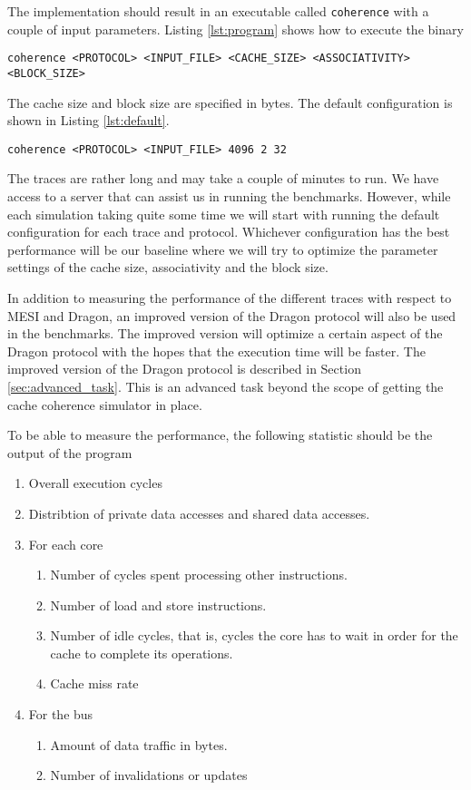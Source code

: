 The implementation should result in an executable called \texttt{coherence} with a couple of input parameters. Listing \ref{lst:program} shows how to execute the binary
\begin{lstlisting}[label=lst:program]
coherence <PROTOCOL> <INPUT_FILE> <CACHE_SIZE> <ASSOCIATIVITY> <BLOCK_SIZE>
\end{lstlisting}
The cache size and block size are specified in bytes.
The default configuration is shown in Listing \ref{lst:default}.
\begin{lstlisting}[label=lst:default]
coherence <PROTOCOL> <INPUT_FILE> 4096 2 32 
\end{lstlisting}
The traces are rather long and may take a couple of minutes to run.
We have access to a server that can assist us in running the benchmarks.
However, while each simulation taking quite some time we will start with running the default configuration for each trace and protocol.
Whichever configuration has the best performance will be our baseline where we will try to optimize the parameter settings of the cache size, associativity and the block size.

In addition to measuring the performance of the different traces with respect to MESI and Dragon, an improved version of the Dragon protocol will also be used in the benchmarks. 
The improved version will optimize a certain aspect of the Dragon protocol with the hopes that the execution time will be faster.
The improved version of the Dragon protocol is described in Section \ref{sec:advanced_task}.
This is an advanced task beyond the scope of getting the cache coherence simulator in place.

To be able to measure the performance, the following statistic should be the output of the program
\begin{enumerate}
    \item Overall execution cycles
    \item Distribtion of private data accesses and shared data accesses.
    \item For each core
    \begin{enumerate}
        \item Number of cycles spent processing other instructions.
        \item Number of load and store instructions.
        \item Number of idle cycles, that is, cycles the core has to wait in order for the cache to complete its operations.
        \item Cache miss rate
    \end{enumerate}
    \item For the bus
    \begin{enumerate}
        \item Amount of data traffic in bytes.
        \item Number of invalidations or updates
    \end{enumerate}
\end{enumerate}



